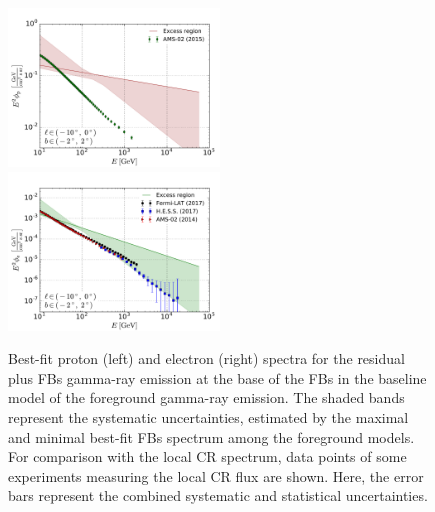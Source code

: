 \begin{figure}[h]
\includegraphics[width=0.5\textwidth]{plots/Summary_proton_spectra_0.pdf}
\includegraphics[width=0.5\textwidth]{plots/Summary_electron_spectra_0.pdf}
  	\caption{
	Best-fit proton (left) and electron (right) spectra for the residual plus FBs gamma-ray emission at the base of the FBs 
	in the baseline model of the foreground gamma-ray emission. 
	The shaded bands represent the systematic uncertainties, 
	estimated by the maximal and minimal best-fit FBs spectrum among the foreground models. 
	For comparison with the local CR spectrum, data points of some experiments measuring the local CR flux are shown. 
	Here, the error bars represent the combined systematic and statistical uncertainties.}
  	\label{fig:Particle_spectra}
\end{figure}

